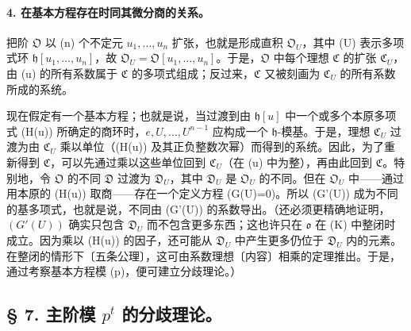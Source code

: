 \paragraph{4. 在基本方程存在时同其微分商的关系。}
把阶 \(\mathfrak O\) 以 (n) 个不定元 \(u_1,\ldots,u_n\) 扩张，也就是形成直积 \(\mathfrak O_U\)，其中 (U) 表示多项式环 \(\mathfrak h[u_1,\ldots,u_n]\)，故 \(\mathfrak O_U=\mathfrak O[u_1,\ldots,u_n]\)。于是，\(\mathfrak O\) 中每个理想 \(\mathfrak C\) 的扩张 \(\mathfrak C_U\)，由 (u) 的所有系数属于 \(\mathfrak C\) 的多项式组成；反过来，\(\mathfrak C\) 又被刻画为 \(\mathfrak C_U\) 的所有系数所成的系统。

现在假定有一个基本方程；也就是说，当过渡到由 \(\mathfrak h[u]\) 中一个或多个本原多项式 (H(u)) 所确定的商环时，\(e,U,\ldots,U^{n-1}\) 应构成一个 \(\mathfrak h\)-模基。于是，理想 \(\mathfrak C_U\) 过渡为由 \(\mathfrak C_U\) 乘以单位（(H(u)) 及其正负整数次幂）而得到的系统。因此，为了重新得到 \(\mathfrak C\)，可以先通过乘以这些单位回到 \(\mathfrak C_U\)（在 (u) 中为整），再由此回到 \(\mathfrak C\)。特别地，令 \(\mathfrak O\) 的不同 \(\mathfrak D\) 过渡为 \(\mathfrak D_U\)，其中 \(\mathfrak D_U\) 是 \(\mathfrak O_U\) 的不同。但在 \(\mathfrak O_U\) 中——通过用本原的 (H(u)) 取商——存在一个定义方程 (G(U)=0)。所以 (G'(U)) 成为不同的基多项式，也就是说，不同由 (G'(U)) 的系数导出。（还必须更精确地证明，\((G'(U))\) 确实只包含 \(\mathfrak D_U\) 而不包含更多东西；这也许只在 \(\mathfrak o\) 在 (K) 中整闭时成立。因为乘以 (H(u)) 的因子，还可能从 \(\mathfrak D_U\) 中产生更多仍位于 \(\mathfrak D_U\) 内的元素。在整闭的情形下〔五条公理〕，这可由系数理想〔内容〕相乘的定理推出。于是，通过考察基本方程模 (p)，便可建立分歧理论。）

\subsection*{\S{} 7. 主阶模 \(p^t\) 的分歧理论。}

